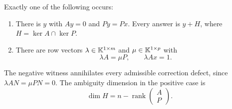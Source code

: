 \begin{proposition}\label{KS57}
Exactly one of the following occurs:
\begin{enumerate}
\item There is \(y\) with \(Ay=0\) and \(Py=Px\). Every answer is \(y+H\), where \(H=\ker A\cap\ker P\).
\item There are row vectors \(\lambda\in\mathbb K^{1\times m}\) and \(\mu\in\mathbb K^{1\times p}\) with
\[
 \lambda A=\mu P,\qquad\lambda Ax=1.
\]
\end{enumerate}
The negative witness annihilates every admissible correction defect, since \(\lambda AN=\mu PN=0\). The ambiguity dimension in the positive case is
\[
 \dim H=n-\operatorname{rank}\begin{pmatrix}A\\P\end{pmatrix}.
\]
\end{proposition}
